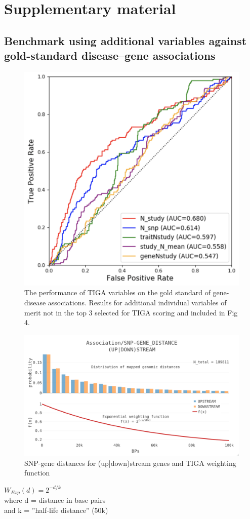 \section{Supplementary material}

\subsection{Benchmark using additional variables against gold-standard disease–gene associations}

\begin{figure}
	\includegraphics[width=\textwidth]{figures/tiga/SupFIG01_AdditionalROCs.png}
	\caption{The performance of TIGA variables on the gold standard of gene-disease associations. Results for additional individual variables of merit not in the top 3 selected for TIGA scoring and included in Fig 4.}
	\label{fig:TIGA_Sup01}
\end{figure}


\begin{figure}
	\includegraphics[width=\textwidth]{figures/tiga/SupFIG02_distance_weighting_function.jpg}
	\caption{SNP-gene distances for (up|down)stream genes and TIGA weighting function}
	\label{fig:TIGA_Sup02}
\end{figure}


\begin{center}
$W_{Exp}(d) = 2^{-d/k}$ \\
where d = distance in base pairs \\ 
and k = ”half-life distance” (50k) \\
\end{center}

